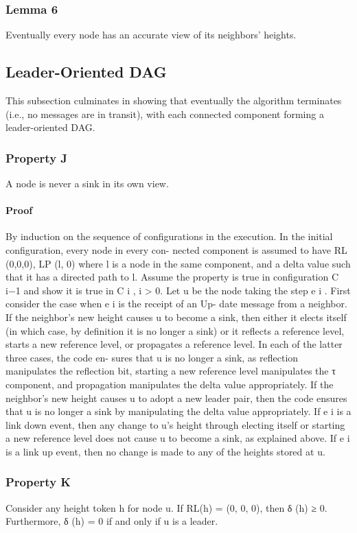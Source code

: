 \documentclass{article}
\begin{document}
\subsubsection{Lemma 6}
Eventually every node has an accurate view of
its neighbors’ heights.
\subsection{Leader-Oriented DAG}
This subsection culminates in showing that eventually
the algorithm terminates (i.e., no messages are in transit),
with each connected component forming a leader-oriented
DAG.
\subsubsection{Property J}
A node is never a sink in its own view.
\paragraph{Proof}
By induction on the sequence of configurations in
the execution.
In the initial configuration, every node in every con-
nected component is assumed to have RL (0,0,0), LP (l, 0)
where l is a node in the same component, and a delta value
such that it has a directed path to l.
Assume the property is true in configuration C i−1 and
show it is true in C i , i > 0. Let u be the node taking the step
e i .
First consider the case when e i is the receipt of an Up-
date message from a neighbor. If the neighbor’s new height
causes u to become a sink, then either it elects itself (in
which case, by definition it is no longer a sink) or it reflects a
reference level, starts a new reference level, or propagates a
reference level. In each of the latter three cases, the code en-
sures that u is no longer a sink, as reflection manipulates the
reflection bit, starting a new reference level manipulates the
τ component, and propagation manipulates the delta value
appropriately. If the neighbor’s new height causes u to adopt
a new leader pair, then the code ensures that u is no longer
a sink by manipulating the delta value appropriately.
If e i is a link down event, then any change to u’s height
through electing itself or starting a new reference level does
not cause u to become a sink, as explained above. If e i is a
link up event, then no change is made to any of the heights
stored at u.
\subsubsection{Property K} 
Consider any height token h for node u. If
RL(h) = (0, 0, 0), then δ (h) ≥ 0. Furthermore, δ (h) = 0 if
and only if u is a leader.
\end{document}
